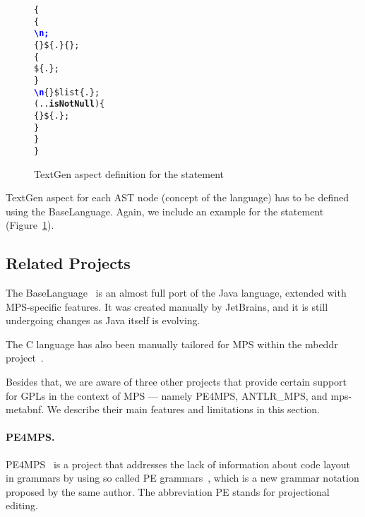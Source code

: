 \begin{figure}[ht]
\centering
\begin{alltt}
\small
{}  \{
   \{
     \textcolor{Blue}{\textbf{\textbackslash{}n;}}
     \{\} \$\{.\} \{\mpstgliteral{) \{}\};
     \{
       \$\{.\};
    \}
     \textcolor{Blue}{\textbf{\textbackslash{}n}} \{\mpstgliteral{\}}\} \$list\{.\};
     (..\textbf{isNotNull}) \{
       \{ \} \$\{.\};
    \}
  \}
\}
\end{alltt}
\caption{TextGen aspect definition for the  statement}
\label{fig:if_statement_textgen}
\end{figure}

TextGen aspect for each AST node (concept of the language) has to be defined using the BaseLanguage.
Again, we include an example for the  statement (Figure~\ref{fig:if_statement_textgen}).

\subsection{Related Projects}

The BaseLanguage~\cite{ref:BASELANG} is an almost full port of the Java language, extended with MPS-specific features.
It was created manually by JetBrains, and it is still undergoing changes as Java itself is evolving.

The C language has also been manually tailored for MPS within the mbeddr project~\cite{ref:MBEDDR}.

Besides that, we are aware of three other projects that provide certain support for GPLs in the context of MPS --- namely PE4MPS, ANTLR{\_}MPS, and mps-metabnf.
We describe their main features and limitations in this section.

\paragraph{PE4MPS.}
PE4MPS~\cite{ref:PE4MPS} is a project that addresses the lack of information about code layout in grammars by using so called PE grammars~\cite{ref:PE}, which is a new grammar notation proposed by the same author.
The abbreviation PE stands for projectional editing.

